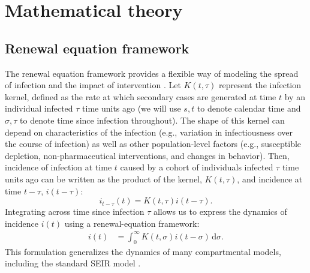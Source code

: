 \documentclass[12pt]{article}
\newcommand{\dd}[1]{\ensuremath{\, \mathrm{d}#1}}
\newcommand{\dsigma}{\dd{\sigma}}
\begin{document}
\section{Mathematical theory}

\subsection{Renewal equation framework}

The renewal equation framework provides a flexible way of modeling the spread of infection and the impact of intervention \citep{fraser2007estimating}.
Let $K(t, \tau)$ represent the infection kernel, defined as the rate at which secondary cases are generated at time $t$ by an individual infected $\tau$ time units ago (we will use $s, t$ to denote calendar time and $\sigma, \tau$ to denote time since infection throughout).
The shape of this kernel can depend on characteristics of the infection (e.g., variation in infectiousness over the course of infection) as well as other population-level factors (e.g., susceptible depletion, non-pharmaceutical interventions, and changes in behavior).
Then, incidence of infection at time $t$ caused by a cohort of individuals infected $\tau$ time units ago can be written as the product of the kernel, $K(t, \tau)$, and incidence at time $t-\tau$, $i(t-\tau)$:
\begin{equation}
i_{t-\tau}(t) = K(t, \tau) i(t-\tau).
\end{equation}
Integrating across time since infection $\tau$ allows us to express the dynamics of incidence $i(t)$ using a renewal-equation framework: 
\begin{align}
i(t) &= \int_0^\infty K(t, \sigma) i(t-\sigma) \dsigma.
\label{eq:renewal}
\end{align}
This formulation generalizes the dynamics of many compartmental models, including the standard SEIR model \citep{heesterbeek1996concept, diekmann2000mathematical, roberts2004modelling, aldis2005integral, roberts2007model, champredon2018equivalence}.
\end{document}
